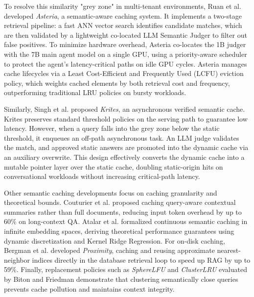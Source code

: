 \documentclass{ieeeaccess}
\begin{document}
To resolve this similarity "grey zone" in multi-tenant environments, Ruan et al. \cite{ruan-asteria-2025} developed \emph{Asteria}, a semantic-aware caching system. It implements a two-stage retrieval pipeline: a fast ANN vector search identifies candidate matches, which are then validated by a lightweight co-located LLM Semantic Judger to filter out false positives. To minimize hardware overhead, Asteria co-locates the 1B judger with the 7B main agent model on a single GPU, using a priority-aware scheduler to protect the agent’s latency-critical paths on idle GPU cycles. Asteria manages cache lifecycles via a Least Cost-Efficient and Frequently Used (LCFU) eviction policy, which weights cached elements by both retrieval cost and frequency, outperforming traditional LRU policies on bursty workloads.

Similarly, Singh et al. \cite{singh-krites-2026} proposed \emph{Krites}, an asynchronous verified semantic cache. Krites preserves standard threshold policies on the serving path to guarantee low latency. However, when a query falls into the grey zone below the static threshold, it enqueues an off-path asynchronous task. An LLM judge validates the match, and approved static answers are promoted into the dynamic cache via an auxiliary overwrite. This design effectively converts the dynamic cache into a mutable pointer layer over the static cache, doubling static-origin hits on conversational workloads without increasing critical-path latency. 

Other semantic caching developments focus on caching granularity and theoretical bounds. Couturier et al. \cite{couturier-contextual-summaries-2025} proposed caching query-aware contextual summaries rather than full documents, reducing input token overhead by up to 60\% on long-context QA. Atalar et al. \cite{atalar-continuous-cache-2026} formalized continuous semantic caching in infinite embedding spaces, deriving theoretical performance guarantees using dynamic discretization and Kernel Ridge Regression. For on-disk caching, Bergman et al. \cite{bergman-proximity-2025} developed \emph{Proximity}, caching and reusing approximate nearest-neighbor indices directly in the database retrieval loop to speed up RAG by up to 59\%. Finally, replacement policies such as \emph{SphereLFU} and \emph{ClusterLRU} evaluated by Biton and Friedman \cite{biton-exact-hits-2025} demonstrate that clustering semantically close queries prevents cache pollution and maintains context integrity.
\end{document}
